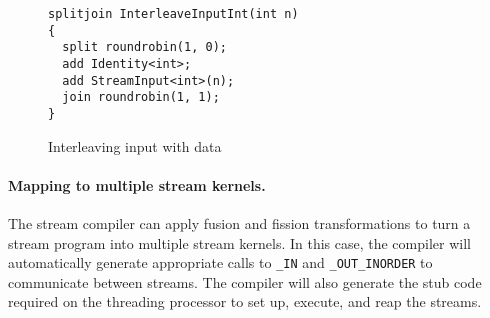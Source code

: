 \documentclass[11pt]{article}
\begin{document}
\begin{figure}[htbp]
  \begin{verbatim}
splitjoin InterleaveInputInt(int n)
{
  split roundrobin(1, 0);
  add Identity<int>;
  add StreamInput<int>(n);
  join roundrobin(1, 1);
}
\end{verbatim}
  \caption{Interleaving input with data}
  \label{fig:interleave-input}
\end{figure}

\paragraph{Mapping to multiple stream kernels.}  The stream compiler
can apply fusion and fission transformations to turn a stream program
into multiple stream kernels.  In this case, the compiler will
automatically generate appropriate calls to \texttt{\_IN} and
\texttt{\_OUT\_INORDER} to communicate between streams.  The compiler
will also generate the stub code required on the threading processor
to set up, execute, and reap the streams.
\end{document}
